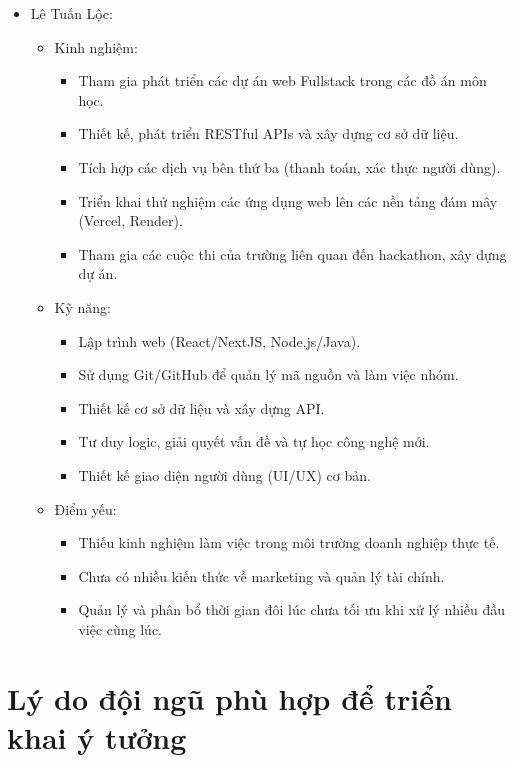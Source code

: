 \begin{itemize}
    \item Lê Tuấn Lộc:
    \begin{itemize}
        \item Kinh nghiệm:
            \begin{itemize}
                \item Tham gia phát triển các dự án web Fullstack trong các đồ án môn học.
                \item Thiết kế, phát triển RESTful APIs và xây dựng cơ sở dữ liệu.
                \item Tích hợp các dịch vụ bên thứ ba (thanh toán, xác thực người dùng).
                \item Triển khai thử nghiệm các ứng dụng web lên các nền tảng đám mây (Vercel, Render).
                \item Tham gia các cuộc thi của trường liên quan đến hackathon, xây dựng dự án.
            \end{itemize}
        \item Kỹ năng:
            \begin{itemize}
                \item Lập trình web (React/NextJS, Node.js/Java).
                \item Sử dụng Git/GitHub để quản lý mã nguồn và làm việc nhóm.
                \item Thiết kế cơ sở dữ liệu và xây dựng API.
                \item Tư duy logic, giải quyết vấn đề và tự học công nghệ mới.
                \item Thiết kế giao diện người dùng (UI/UX) cơ bản.
            \end{itemize}
        \item Điểm yếu:
            \begin{itemize}
                \item Thiếu kinh nghiệm làm việc trong môi trường doanh nghiệp thực tế.
                \item Chưa có nhiều kiến thức về marketing và quản lý tài chính.
                \item Quản lý và phân bổ thời gian đôi lúc chưa tối ưu khi xử lý nhiều đầu việc cùng lúc.
            \end{itemize}
    \end{itemize}
    
\end{itemize}

\section{Lý do đội ngũ phù hợp để triển khai ý tưởng}

